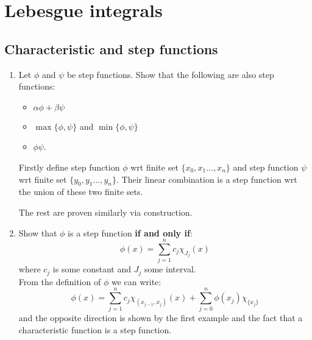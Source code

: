 \section{Lebesgue integrals}

\subsection{Characteristic and step functions}
\begin{enumerate}
    \item Let $\phi$ and $\psi$ be step functions. Show that the following are also step functions:
    \begin{itemize}
        \item $\alpha\phi+\beta\psi$
        \item $\max\{\phi,\psi\}$ and $\min\{\phi,\psi\}$
        \item $\phi\psi$. \\
    \end{itemize}

    Firstly define step function $\phi$ wrt finite set $\{x_0,x_1\dots,x_n\}$
    and step function $\psi$ wrt finite set $\{y_0,y_1\dots,y_n\}$.
    Their linear combination is a step function wrt the union of these two finite sets.

    The rest are proven similarly via construction.

    \item Show that $\phi$ is a step function \textbf{if and only if}:
    $$\phi(x)=\sum_{j=1}^{n}c_j\chi_{J_j}(x)$$
    where $c_j$ is some constant and $J_j$ some interval. \\

    From the definition of $\phi$ we can write:
    $$\phi(x)=\sum_{j=1}^{n}c_j\chi_{(x_{j-1},x_j)}(x)
    +\sum_{j=0}^{n}\phi(x_j)\chi_{\{x_j\}}$$
    and the opposite direction is shown by the first example
    and the fact that a characteristic function is a step function.
\end{enumerate}